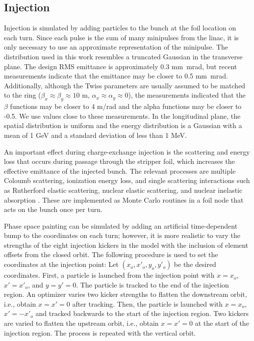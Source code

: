 \subsection{Injection}

Injection is simulated by adding particles to the bunch at the foil location on each turn. Since each pulse is the sum of many minipulses from the linac, it is only necessary to use an approximate representation of the minipulse. The distribution used in this work resembles a truncated Gaussian in the transverse plane. The design RMS emittance is approximately 0.3 mm~mrad, but recent measurements indicate that the emittance may be closer to 0.5 mm~mrad. Additionally, although the Twiss parameters are usually assumed to be matched to the ring ($\beta_x \approx \beta_y \approx 10$ m, $\alpha_x \approx \alpha_y \approx 0$), the measurements indicated that the $\beta$ functions may be closer to 4 m/rad and the alpha functions may be closer to -0.5. We use values close to these measurements. In the longitudinal plane, the spatial distribution is uniform and the energy distribution is a Gaussian with a mean of 1 GeV and a standard deviation of less than 1 MeV.

An important effect during charge-exchange injection is the scattering and energy loss that occurs during passage through the stripper foil, which increases the effective emittance of the injected bunch. The relevant processes are multiple Coloumb scattering, ionization energy loss, and single scattering interactions such as Rutherford elastic scattering, nuclear elastic scattering, and nuclear inelastic absorption \cite{Chao2012, Cousineau2003}. These are implemented as Monte Carlo routines in a foil node that acts on the bunch once per turn.

Phase space painting can be simulated by adding an artificial time-dependent bump to the coordinates on each turn; however, it is more realistic to vary the strengths of the eight injection kickers in the model with the inclusion of element offsets from the closed orbit. The following procedure is used to set the coordinates at the injection point: Let $(x_o, x'_o, y_o, y'_o)$ be the desired coordinates. First, a particle is launched from the injection point with $x = x_o$, $x' = x'_o$, and $y = y' = 0$. The particle is tracked to the end of the injection region. An optimizer varies two kicker strengths to flatten the downstream orbit, i.e., obtain $x = x' = 0$ after tracking. Then, the particle is launched with $x = x_o$, $x' = -x'_o$ and tracked backwards to the start of the injection region. Two kickers are varied to flatten the upstream orbit, i.e., obtain $x = x' = 0$ at the start of the injection region. The process is repeated with the vertical orbit.


